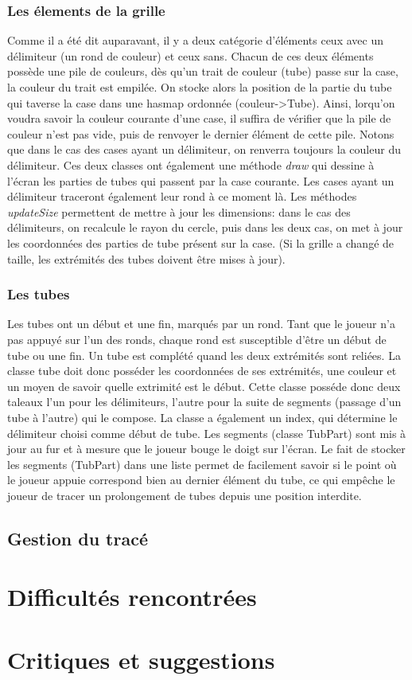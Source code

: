 \documentclass[12pt, a4paper]{article}%
\begin{document}
    \subsubsection{Les élements de la grille}
    Comme il a été dit auparavant, il y a deux catégorie d'éléments ceux avec un délimiteur (un rond de couleur) et ceux sans.
    Chacun de ces deux éléments possède une pile de couleurs, dès qu'un trait de couleur (tube) passe sur la case, la couleur du
    trait est empilée. On stocke alors la position de la partie du tube qui taverse la case dans une hasmap ordonnée
    (couleur->Tube). Ainsi, lorqu'on voudra savoir la couleur courante d'une case, il suffira de vérifier que la pile de couleur
    n'est pas vide, puis de renvoyer le dernier élément de cette pile. Notons que dans le cas des cases ayant un délimiteur, on
    renverra toujours la couleur du délimiteur. Ces deux classes ont également une méthode \textit{draw} qui dessine à l'écran les
    parties de tubes qui passent par la case courante. Les cases ayant un délimiteur traceront également leur rond à ce moment là.
    Les méthodes \textit{updateSize} permettent de mettre à jour les dimensions: dans le cas des délimiteurs, on recalcule le
    rayon du cercle, puis dans les deux cas, on met à jour les coordonnées des parties de tube présent sur la case. (Si la grille
    a changé de taille, les extrémités des tubes doivent être mises à jour).
    \subsubsection{Les tubes}
    Les tubes ont un début et une fin, marqués par un rond. Tant que le joueur n'a pas appuyé sur l'un des ronds, chaque rond est
    susceptible d'être un début de tube ou une fin. Un tube est complété quand les deux extrémités sont reliées. La classe tube
    doit donc posséder les coordonnées de ses extrémités, une couleur et un moyen de savoir quelle extrimité est le début. 
    Cette classe posséde donc deux taleaux l'un pour les délimiteurs, l'autre pour la suite de segments (passage d'un tube à
    l'autre) qui le compose. La classe a également un index, qui détermine le délimiteur choisi comme début de tube.
    Les segments (classe TubPart) sont mis à jour au fur et à mesure que le joueur bouge le doigt sur l'écran.
    Le fait de  stocker les segments (TubPart) dans une liste permet de facilement savoir si le point où le joueur appuie
    correspond bien au dernier élément du tube, ce qui empêche le joueur de tracer un prolongement de tubes depuis une position
    interdite.
    \subsection{Gestion du tracé}
\section{Difficultés rencontrées}
\section{Critiques et suggestions}
\end{document}
